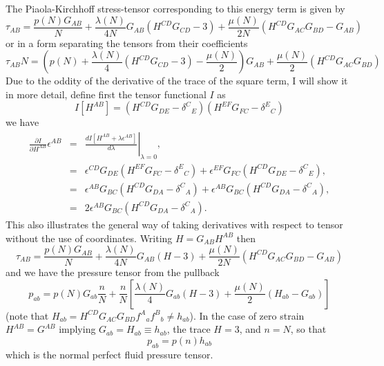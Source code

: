 The Piaola-Kirchhoff stress-tensor corresponding to this energy term is given by
\begin{equation}
\label{eqn:pkTensor}
\tau_{AB} = \frac{p(N)G_{AB}}{N} +
\frac{\lambda(N)}{4N}G_{AB}\left(H^{CD}G_{CD}-3\right) + \frac{\mu(N)}{2N}\left(H^{CD}G_{AC}G_{BD} - G_{AB}\right)
\end{equation}
or in a form separating the tensors from their coefficients
\begin{equation}
\label{eqn:pkTensorIso}
\tau_{AB}N = \left(p(N) +
\frac{\lambda(N)}{4}\left(H^{CD}G_{CD}-3\right)-\frac{\mu(N)}{2}\right)G_{AB} +
\frac{\mu(N)}{2}\left(H^{CD}G_{AC}G_{BD}\right)
\end{equation}
Due to the oddity of the derivative of the trace of the square term, I will show it in more detail, define first the tensor functional $I$ as
\begin{equation}
I[H^{AB}] = \left(H^{CD}G_{DE} - \delta^{C}{}_E\right)\left(H^{EF}G_{FC} - \delta^{E}{}_C\right)
\end{equation}
we have
\begin{eqnarray}
\frac{\partial I}{\partial H^{AB}}\epsilon^{AB} & =& \left.\frac{dI\left[H^{AB}+\lambda\epsilon^{AB}\right]}{d\lambda}\right|_{\lambda = 0}, \\
 & = & \epsilon^{CD}G_{DE}\left(H^{EF}G_{FC} - \delta^{E}{}_C\right) + \epsilon^{EF}G_{FC}\left(H^{CD}G_{DE} - \delta^{C}{}_E\right), \\
 & = & \epsilon^{AB}G_{BC}\left(H^{CD}G_{DA} - \delta^{C}{}_A\right) + \epsilon^{AB}G_{BC}\left(H^{CD}G_{DA} - \delta^{C}{}_A\right), \\
 & = & 2\epsilon^{AB}G_{BC}\left(H^{CD}G_{DA} - \delta^{C}{}_A\right).
\end{eqnarray}
This also illustrates the general way of taking derivatives with respect to tensor without the use of coordinates. Writing $H=G_{AB}H^{AB}$ then
\begin{equation}
\tau_{AB} = \frac{p(N)G_{AB}}{N} +
\frac{\lambda(N)}{4N}G_{AB}\left(H-3\right) + \frac{\mu(N)}{2N}\left(H^{CD}G_{AC}G_{BD} - G_{AB}\right)
\end{equation}
and we have the pressure tensor from the pullback
\begin{equation}
p_{ab} = p(N)G_{ab}\frac{n}{N} +
\frac{n}{N}\left[\frac{\lambda(N)}{4}G_{ab}\left(H-3\right) + \frac{\mu(N)}{2}\left(H_{ab} - G_{ab}\right)\right]
\end{equation}
(note that $H_{ab} = H^{CD}G_{AC}G_{BD} f^A{}_af^B{}_b \neq h_{ab}$). In the case of zero strain $H^{AB} = G^{AB}$ implying $G_{ab} = H_{ab}\equiv h_{ab}$, the trace $H=3$, and $n=N$, so that
\begin{equation}
p_{ab} = p(n)h_{ab}
\end{equation}
which is the normal perfect fluid pressure tensor.
